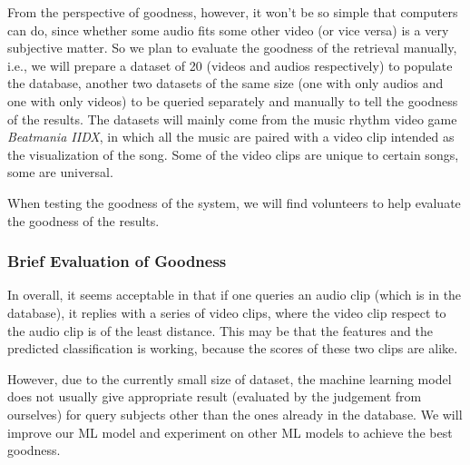 \documentclass{report}
\begin{document}
From the perspective of goodness, however, it won’t be so simple that computers can do, since whether some audio fits some other video (or vice versa) is a very subjective matter. So we plan to evaluate the goodness of the retrieval manually, i.e., we will prepare a dataset of 20 (videos and audios respectively) to populate the database, another two datasets of the same size (one with only audios and one with only videos) to be queried separately and manually to tell the goodness of the results. The datasets will mainly come from the music rhythm video game \textit{Beatmania IIDX}, in which all the music are paired with a video clip intended as the visualization of the song. Some of the video clips are unique to certain songs, some are universal.

When testing the goodness of the system, we will find volunteers to help evaluate the goodness of the results.

\subsubsection{Brief Evaluation of Goodness}

In overall, it seems acceptable in that if one queries an audio clip (which is in the database), it replies with a series of video clips, where the video clip respect to the audio clip is of the least distance. This may be that the features and the predicted classification is working, because the scores of these two clips are alike.

However, due to the currently small size of dataset, the machine learning model does not usually give appropriate result (evaluated by the judgement from ourselves) for query subjects other than the ones already in the database. We will improve our ML model and experiment on other ML models to achieve the best goodness.


\nocite{*}

\end{document}
